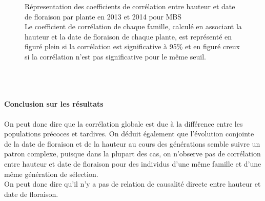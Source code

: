 \documentclass[12pt,a4paper]{article}
\begin{document}
			 				\begin{figure} [!h]
			 					\caption{Répresentation des coefficients de corrélation entre hauteur et date de floraison par plante en 2013 et 2014 pour MBS\\
			 					Le coefficient de corrélation de chaque famille, calculé en associant la hauteur et la date de floraison de chaque plante, est représenté en figuré plein si la corrélation est significative à 95\% et en figuré creux si la corrélation n'est pas significative pour le même seuil.
			 					\label{correlmbs}}
			 				\end{figure}
			 				~\\ ~\\
			 				\paragraph{Conclusion sur les résultats}
			 				On peut donc dire que la corrélation globale est due à la différence entre les populations précoces et tardives. On déduit également que l'évolution conjointe de la date de floraison et de la hauteur au cours des générations semble suivre un patron complexe, puisque dans la plupart des cas, on n'observe pas de corrélation entre hauteur et date de floraison pour des individus d'une même famille et d'une même génération de sélection.\\
			 				On peut donc dire qu'il n'y a pas de relation de causalité directe entre hauteur et date de floraison.
\end{document}
